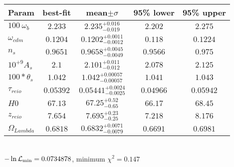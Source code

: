 \begin{tabular}{|l|c|c|c|c|} 
 \hline 
Param & best-fit & mean$\pm\sigma$ & 95\% lower & 95\% upper \\ \hline 
$100~\omega{}_{b }$ &$2.233$ & $2.235_{-0.019}^{+0.016}$ & $2.202$ & $2.275$ \\ 
$\omega{}_{cdm }$ &$0.1204$ & $0.1202_{-0.0012}^{+0.0011}$ & $0.118$ & $0.1224$ \\ 
$n_{s }$ &$0.9651$ & $0.9658_{-0.0049}^{+0.0045}$ & $0.9566$ & $0.975$ \\ 
$10^{+9}A_{s }$ &$2.1$ & $2.101_{-0.012}^{+0.011}$ & $2.078$ & $2.125$ \\ 
$100*\theta{}_{s }$ &$1.042$ & $1.042_{-0.00057}^{+0.00057}$ & $1.041$ & $1.043$ \\ 
$\tau{}_{reio }$ &$0.05392$ & $0.05441_{-0.0025}^{+0.0024}$ & $0.04966$ & $0.05942$ \\ 
$H0$ &$67.13$ & $67.25_{-0.65}^{+0.52}$ & $66.17$ & $68.45$ \\ 
$z_{reio }$ &$7.654$ & $7.695_{-0.25}^{+0.23}$ & $7.218$ & $8.176$ \\ 
$\Omega{}_{Lambda }$ &$0.6818$ & $0.6832_{-0.0079}^{+0.0071}$ & $0.6691$ & $0.6981$ \\ 
\hline 
 \end{tabular} \\ 
$-\ln{\cal L}_\mathrm{min} =0.0734878$, minimum $\chi^2=0.147$ \\ 
